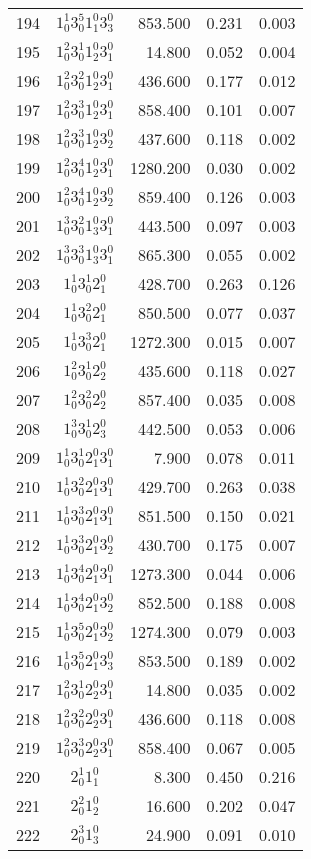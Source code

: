 \begin{table}
\begin{tabular}{rcrrr}
194&$1_0^1 3_0^5 1_1^0 3_3^0$& 853.500& 0.231& 0.003\\
195&$1_0^2 3_0^1 1_2^0 3_1^0$& 14.800& 0.052& 0.004\\
196&$1_0^2 3_0^2 1_2^0 3_1^0$& 436.600& 0.177& 0.012\\
197&$1_0^2 3_0^3 1_2^0 3_1^0$& 858.400& 0.101& 0.007\\
198&$1_0^2 3_0^3 1_2^0 3_2^0$& 437.600& 0.118& 0.002\\
199&$1_0^2 3_0^4 1_2^0 3_1^0$& 1280.200& 0.030& 0.002\\
200&$1_0^2 3_0^4 1_2^0 3_2^0$& 859.400& 0.126& 0.003\\
201&$1_0^3 3_0^2 1_3^0 3_1^0$& 443.500& 0.097& 0.003\\
202&$1_0^3 3_0^3 1_3^0 3_1^0$& 865.300& 0.055& 0.002\\
203&$1_0^1 3_0^1 2_1^0$& 428.700& 0.263& 0.126\\
204&$1_0^1 3_0^2 2_1^0$& 850.500& 0.077& 0.037\\
205&$1_0^1 3_0^3 2_1^0$& 1272.300& 0.015& 0.007\\
206&$1_0^2 3_0^1 2_2^0$& 435.600& 0.118& 0.027\\
207&$1_0^2 3_0^2 2_2^0$& 857.400& 0.035& 0.008\\
208&$1_0^3 3_0^1 2_3^0$& 442.500& 0.053& 0.006\\
209&$1_0^1 3_0^1 2_1^0 3_1^0$& 7.900& 0.078& 0.011\\
210&$1_0^1 3_0^2 2_1^0 3_1^0$& 429.700& 0.263& 0.038\\
211&$1_0^1 3_0^3 2_1^0 3_1^0$& 851.500& 0.150& 0.021\\
212&$1_0^1 3_0^3 2_1^0 3_2^0$& 430.700& 0.175& 0.007\\
213&$1_0^1 3_0^4 2_1^0 3_1^0$& 1273.300& 0.044& 0.006\\
214&$1_0^1 3_0^4 2_1^0 3_2^0$& 852.500& 0.188& 0.008\\
215&$1_0^1 3_0^5 2_1^0 3_2^0$& 1274.300& 0.079& 0.003\\
216&$1_0^1 3_0^5 2_1^0 3_3^0$& 853.500& 0.189& 0.002\\
217&$1_0^2 3_0^1 2_2^0 3_1^0$& 14.800& 0.035& 0.002\\
218&$1_0^2 3_0^2 2_2^0 3_1^0$& 436.600& 0.118& 0.008\\
219&$1_0^2 3_0^3 2_2^0 3_1^0$& 858.400& 0.067& 0.005\\
220&$2_0^1 1_1^0$& 8.300& 0.450& 0.216\\
221&$2_0^2 1_2^0$& 16.600& 0.202& 0.047\\
222&$2_0^3 1_3^0$& 24.900& 0.091& 0.010\\

\end{tabular}
\end{table}
